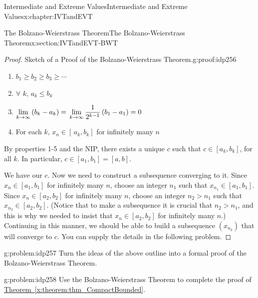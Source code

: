 \begin{chapterptx}{Intermediate and Extreme Values}{}{Intermediate and Extreme Values}{}{}{x:chapter:IVTandEVT}
\begin{sectionptx}{The Bolzano-Weierstrass Theorem}{}{The Bolzano-Weierstrass Theorem}{}{}{x:section:IVTandEVT-BWT}
\begin{proof}{Sketch of a Proof of the Bolzano-Weierstrass Theorem.}{g:proof:idp256}
\begin{enumerate}
				\item{}\(\displaystyle b_1\geq b_2\geq b_3\geq\cdots\)%
				\item{}\(\forall\) \(k,\,a_k\leq b_k\)%
				\item{}\(\displaystyle \displaystyle\lim_{k\rightarrow\infty}\left(b_k-a_k\right)=\,\lim_{k\rightarrow\infty} \frac{1}{2^{k-1}}\left(b_1-a_1\right)=0\)%
				\item{}For each \(k\), \(x_n\in[\,a_k,b_k]\) for infinitely many \(n\)%
			\end{enumerate}
			\par
			By properties 1-5 and the NIP, there exists a unique \(c\) such that \(c\in[a_k,b_k]\), for all \(k\). In particular, \(c\in[a_1,b_1]=[a,b]\).%
			\par
			We have our \(c\). Now we need to construct a subsequence converging to it. Since \(x_n\in[a_1,b_1]\) for infinitely many \(n\), choose an integer \(n_1\) such that \(x_{n_1}\in[a_1,b_1]\). Since \(x_n\in[a_2,b_2]\) for infinitely many \(n\), choose an integer \(n_2>n_1\) such that \(x_{n_2}\in[a_2,b_2]\). (Notice that to make a subsequence it is crucial that \(n_2>n_1\), and this is why we needed to insist that \(x_n\in[a_2,b_2]\) for infinitely many \(n\).) Continuing in this manner, we should be able to build a subsequence \(\left(x_{n_k}\right)\) that will converge to \(c\). You can supply the details in the following problem.%
		\end{proof}
		\begin{problem}{}{g:problem:idp257}%
			 Turn the ideas of the above outline into a formal proof of the Bolzano-Weierstrass Theorem.%
		\end{problem}
		\begin{problem}{}{g:problem:idp258}%
			 Use the Bolzano-Weierstrass Theorem to complete the proof of \hyperref[x:theorem:thm_CompactBounded]{Theorem~{\xreffont\ref{x:theorem:thm_CompactBounded}}}.%
		\end{problem}
	\end{sectionptx}
	\typeout{************************************************}
	\typeout{************************************************}

\end{chapterptx}
